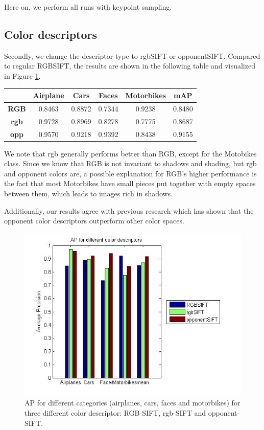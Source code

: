\documentclass[11pt]{article}
\begin{document}
Here on, we perform all runs with keypoint sampling. 

\subsection{Color descriptors}
Secondly, we change the descriptor type to rgbSIFT or opponentSIFT. Compared to regular RGBSIFT, the results are shown in the following table and visualized in Figure \ref{fig:color_descriptors}.

\begin{center}
	\begin{tabular}{| c | c | c | c | c | c |}
		\hline
		\textbf{} & \textbf{Airplane} & \textbf{Cars} & \textbf{Faces} & \textbf{Motorbikes} & \textbf{mAP} \\ \hline
		\textbf{RGB} & 0.8463 & 0.8872 & 0.7344 & 0.9238 & 0.8480 \\ \hline
		\textbf{rgb} & 0.9728 & 0.8969 & 0.8278 & 0.7775 & 0.8687 \\ \hline
		\textbf{opp} & 0.9570 & 0.9218 & 0.9392 & 0.8438 & 0.9155 \\ 
		\hline
	\end{tabular}
\end{center}

We note that rgb generally performs better than RGB, except for the Motobikes class. Since we know that RGB is not invariant to shadows and shading, but rgb and opponent colors are, a possible explanation for RGB's higher performance is the fact that most Motorbikes have small pieces put together with empty spaces between them, which leads to images rich in shadows. 

Additionally, our results agree with previous research which has shown that the opponent color descriptors outperform other color spaces. 

\begin{figure}[h]
	\centering
	\includegraphics[width=.8\textwidth]{img/color_descriptors.jpg}
	\caption{AP for different categories (airplanes, cars, faces and motorbikes) for three different color descriptor: RGB-SIFT, rgb-SIFT and opponent-SIFT.}
	\label{fig:color_descriptors}
\end{figure}
\end{document}

